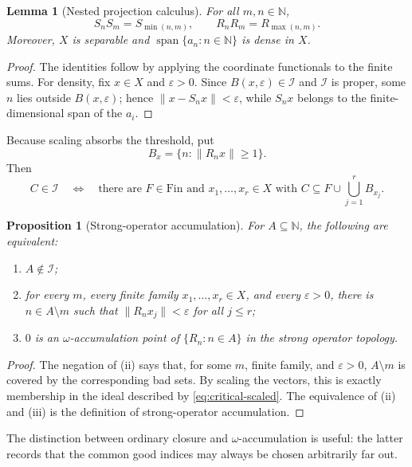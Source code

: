 \documentclass[11pt]{article}
\newtheorem{proposition}[theorem]{Proposition}
\newtheorem{lemma}[theorem]{Lemma}
\theoremstyle{definition}
\theoremstyle{remark}
\newcommand{\N}{\mathbb N}
\newcommand{\I}{\mathcal I}
\newcommand{\Fin}{\mathrm{Fin}}
\newcommand{\spanop}{\operatorname{span}}
\newcommand{\eps}{\varepsilon}
\begin{document}
\begin{lemma}[Nested projection calculus]\label{lem:projection-calculus}
For all $m,n\in\N$,
\[
 S_nS_m=S_{\min(n,m)},
 \qquad
 R_nR_m=R_{\max(n,m)}.
\]
Moreover, $X$ is separable and $\spanop\{a_n:n\in\N\}$ is dense in $X$.
\end{lemma}

\begin{proof}
The identities follow by applying the coordinate functionals to the finite
sums.  For density, fix $x\in X$ and $\eps>0$.  Since $B(x,\eps)\in\I$ and
$\I$ is proper, some $n$ lies outside $B(x,\eps)$; hence
$\|x-S_nx\|<\eps$, while $S_nx$ belongs to the finite-dimensional span of the
$a_i$.
\end{proof}

Because scaling absorbs the threshold, put
\[
 B_x=\{n:\|R_nx\|\geq1\}.
\]
Then
\begin{equation}\label{eq:critical-scaled}
 C\in\I
 \quad\Longleftrightarrow\quad
 \text{there are }F\in\Fin\text{ and }x_1,\ldots,x_r\in X
 \text{ with }C\subseteq F\cup\bigcup_{j=1}^r B_{x_j}.
\end{equation}

\begin{proposition}[Strong-operator accumulation]\label{prop:sot-accumulation}
For $A\subseteq\N$, the following are equivalent:
\begin{enumerate}[label=(\roman*)]
 \item $A\notin\I$;
 \item for every $m$, every finite family $x_1,\ldots,x_r\in X$, and every
       $\eps>0$, there is $n\in A\setminus m$ such that
       $\|R_nx_j\|<\eps$ for all $j\leq r$;
 \item $0$ is an $\omega$-accumulation point of $\{R_n:n\in A\}$ in the
       strong operator topology.
\end{enumerate}
\end{proposition}

\begin{proof}
The negation of (ii) says that, for some $m$, finite family, and $\eps>0$,
$A\setminus m$ is covered by the corresponding bad sets.  By scaling the
vectors, this is exactly membership in the ideal described by
\eqref{eq:critical-scaled}.  The equivalence of (ii) and (iii) is the
definition of strong-operator accumulation.
\end{proof}

The distinction between ordinary closure and $\omega$-accumulation is useful:
the latter records that the common good indices may always be chosen
arbitrarily far out.
\end{document}
